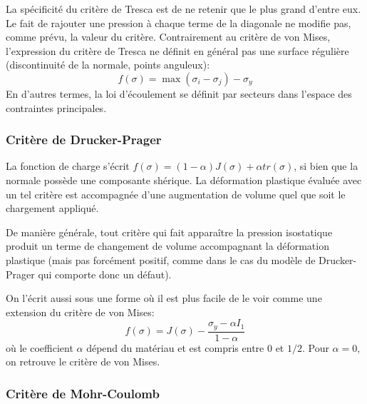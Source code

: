 La spécificité du critère de Tresca est de ne retenir que le plus grand d'entre eux. Le fait
de rajouter une pression à chaque terme de la diagonale ne modifie pas, comme prévu, la valeur du critère.
Contrairement au critère de von Mises, l'expression du critère de Tresca ne définit en général pas une 
surface régulière (discontinuité de la normale, points anguleux):
\begin{equation} f(\sigma) = \max(\sigma_i - \sigma_j) - \sigma_y \end{equation}
En d'autres termes, la loi d'écoulement se définit par secteurs dans l'espace des contraintes principales.


\medskip
\subsubsection{Critère de Drucker-Prager}


\medskip
La fonction de charge s'écrit $f(\sigma)=(1-\alpha)J(\sigma)+\alpha tr(\sigma)$, si
bien que la normale possède une composante shérique.
La déformation plastique évaluée avec un tel critère est accompagnée d'une
augmentation de volume quel que soit le chargement appliqué.

De manière générale, tout critère qui fait apparaître la pression isostatique
produit un terme de changement de volume accompagnant la déformation plastique (mais
pas forcément positif, comme dans le cas du modèle de Drucker-Prager 
qui comporte donc un défaut).

On l'écrit aussi sous une forme où il est plus facile de le voir comme une extension du critère de von Mises:
\begin{equation} f(\sigma) = J(\sigma) - \dfrac{\sigma_y-\alpha I_1}{1-\alpha} \end{equation}
où le coefficient $\alpha$ dépend du matériau et est compris entre 0 et $1/2$. Pour
$\alpha=0$, on retrouve le critère de von Mises.

\medskip
\subsubsection{Critère de Mohr-Coulomb}

